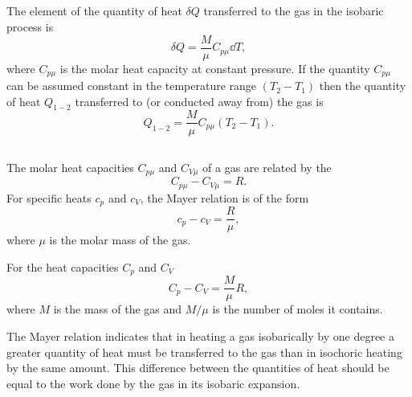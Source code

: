 \subsection{}\label{9.5.7} The element of the quantity of heat $\delta Q$ transferred to the gas in the isobaric process is
\begin{equation*}%
\delta Q = \frac{M}{\mu} C_{p\mu} \dd T,
\end{equation*}
where $C_{p\mu}$ is the molar heat capacity at constant pressure. If the quantity $C_{p\mu}$ can be assumed constant in the temperature
range $(T_{2} - T_{1})$ then the quantity of heat $Q_{1-2}$ transferred to (or conducted away from) the gas is
\begin{equation*}%
Q_{1-2} = \frac{M}{\mu} C_{p\mu} (T_{2} - T_{1}).
\end{equation*}

\subsection{}\label{9.5.8} The molar heat capacities $C_{p\mu}$ and $C_{V\mu}$ of a gas are re­lated by the 
\begin{equation*}%
C_{p\mu} - C_{V\mu} = R.
\end{equation*}
For specific heats $c_{p}$ and $c_{V}$, the Mayer relation is of the form 
\begin{equation*}%
c_{p} - c_{V} = \frac{R}{\mu},
\end{equation*}
where $\mu$ is the molar mass  of the gas. 

For the heat capacities $C_{p}$ and $C_{V}$
\begin{equation*}%
C_{p} - C_{V} = \frac{M}{\mu} R,
\end{equation*}
where $M$ is the mass of the gas and $M/\mu$ is the number of moles it contains.

The Mayer relation indicates that in heating a gas isobarically by one degree a greater quantity of heat must be transferred to the gas than in isochoric heating by the same amount. This difference between the quantities of heat should be equal to the work done by the gas in its isobaric expansion. 


